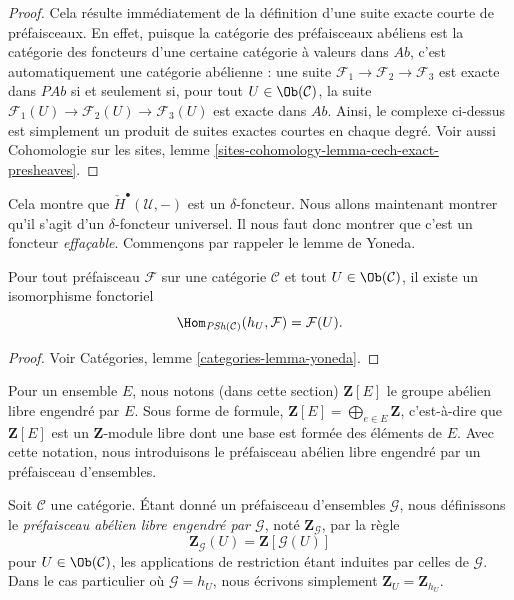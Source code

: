 \begin{proof}
Cela r\'esulte imm\'ediatement de la d\'efinition d'une suite exacte courte de
pr\'efaisceaux. En effet, puisque la cat\'egorie des pr\'efaisceaux ab\'eliens est la cat\'egorie des
foncteurs d'une certaine cat\'egorie \`a valeurs dans $\textit{Ab}$, c'est automatiquement une
cat\'egorie ab\'elienne : une suite $\mathcal{F}_1\to \mathcal{F}_2\to \mathcal{F}_3$
est exacte dans $\textit{PAb}$ si et seulement si, pour tout
$U \in \Ob(\mathcal{C})$, la suite
$\mathcal{F}_1(U) \to \mathcal{F}_2(U) \to \mathcal{F}_3(U)$ est exacte dans
$\textit{Ab}$. Ainsi, le complexe ci-dessus est simplement un produit de suites exactes courtes
en chaque degr\'e. Voir aussi
Cohomologie sur les sites, lemme \ref{sites-cohomology-lemma-cech-exact-presheaves}.
\end{proof}

\noindent
Cela montre que $\check{H}^\bullet(\mathcal{U}, -)$ est un $\delta$-foncteur.
Nous allons maintenant montrer qu'il s'agit d'un $\delta$-foncteur universel. Il nous faut donc
montrer que c'est un foncteur {\it effa\c{c}able}. Commen\c{c}ons par rappeler le
lemme de Yoneda.

\begin{lemma}
\label{lemma-yoneda-presheaf}
Pour tout pr\'efaisceau $\mathcal{F}$ sur une cat\'egorie $\mathcal{C}$
et tout $U \in \Ob(\mathcal{C})$, il existe un isomorphisme fonctoriel
$$
\Hom_{\textit{PSh}(\mathcal{C})}(h_U, \mathcal{F}) =
\mathcal{F}(U).
$$
\end{lemma}

\begin{proof}
Voir Catégories, lemme \ref{categories-lemma-yoneda}.
\end{proof}

\noindent
Pour un ensemble $E$, nous notons (dans cette section)
$\mathbf{Z}[E]$ le groupe ab\'elien libre engendr\'e par $E$. Sous forme de formule,
$\mathbf{Z}[E] = \bigoplus_{e \in E} \mathbf{Z}$, c'est-\`a-dire que $\mathbf{Z}[E]$ est
un $\mathbf{Z}$-module libre dont une base est form\'ee des \'el\'ements de $E$.
Avec cette notation, nous introduisons le pr\'efaisceau ab\'elien libre engendr\'e par un
pr\'efaisceau d'ensembles.

\begin{definition}
\label{definition-free-abelian-presheaf}
Soit $\mathcal{C}$ une cat\'egorie.
\'Etant donn\'e un pr\'efaisceau d'ensembles $\mathcal{G}$, nous d\'efinissons le
{\it pr\'efaisceau ab\'elien libre engendr\'e par $\mathcal{G}$},
not\'e $\mathbf{Z}_\mathcal{G}$, par la r\`egle
$$
\mathbf{Z}_\mathcal{G}(U)
=
\mathbf{Z}[\mathcal{G}(U)]
$$
pour $U \in \Ob(\mathcal{C})$,
les applications de restriction \'etant induites par celles de $\mathcal{G}$.
Dans le cas particulier o\`u $\mathcal{G} = h_U$, nous \'ecrivons simplement
$\mathbf{Z}_U = \mathbf{Z}_{h_U}$.
\end{definition}

